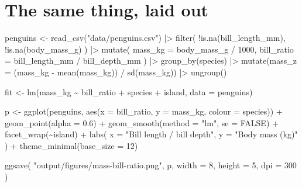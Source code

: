 \documentclass[
  letterpaper,
  justified,
  a4paper]{tufte-book}
\makeatletter
\newenvironment{Shaded}{\begin{snugshade}}{\end{snugshade}}
\newcommand{\AttributeTok}[1]{\textcolor[rgb]{0.40,0.45,0.13}{#1}}
\newcommand{\ConstantTok}[1]{\textcolor[rgb]{0.56,0.35,0.01}{#1}}
\newcommand{\DecValTok}[1]{\textcolor[rgb]{0.68,0.00,0.00}{#1}}
\newcommand{\FloatTok}[1]{\textcolor[rgb]{0.68,0.00,0.00}{#1}}
\newcommand{\FunctionTok}[1]{\textcolor[rgb]{0.28,0.35,0.67}{#1}}
\newcommand{\NormalTok}[1]{\textcolor[rgb]{0.00,0.23,0.31}{#1}}
\newcommand{\OtherTok}[1]{\textcolor[rgb]{0.00,0.23,0.31}{#1}}
\newcommand{\SpecialCharTok}[1]{\textcolor[rgb]{0.37,0.37,0.37}{#1}}
\newcommand{\StringTok}[1]{\textcolor[rgb]{0.13,0.47,0.30}{#1}}
\let\rbporigShaded\Shaded
\let\rbporigendShaded\endShaded
\renewenvironment{Shaded}{%
  \begingroup
  \ifdim\linewidth=\rbpbodywidth
    \advance\linewidth by \@tufte@overhang
    \advance\hsize by \@tufte@overhang
    \advance\columnwidth by \@tufte@overhang
  \fi
  \rbporigShaded
}{%
  \rbporigendShaded
  \endgroup
}
\makeatother
\begin{document}
\section{The same thing, laid out}

\begin{Shaded}
\begin{Highlighting}[]
\NormalTok{penguins }\OtherTok{\textless{}{-}} \FunctionTok{read\_csv}\NormalTok{(}\StringTok{"data/penguins.csv"}\NormalTok{) }\SpecialCharTok{|\textgreater{}}
  \FunctionTok{filter}\NormalTok{(}
    \SpecialCharTok{!}\FunctionTok{is.na}\NormalTok{(bill\_length\_mm),}
    \SpecialCharTok{!}\FunctionTok{is.na}\NormalTok{(body\_mass\_g)}
\NormalTok{  ) }\SpecialCharTok{|\textgreater{}}
  \FunctionTok{mutate}\NormalTok{(}
    \AttributeTok{mass\_kg =}\NormalTok{ body\_mass\_g }\SpecialCharTok{/} \DecValTok{1000}\NormalTok{,}
    \AttributeTok{bill\_ratio =}\NormalTok{ bill\_length\_mm }\SpecialCharTok{/}\NormalTok{ bill\_depth\_mm}
\NormalTok{  ) }\SpecialCharTok{|\textgreater{}}
  \FunctionTok{group\_by}\NormalTok{(species) }\SpecialCharTok{|\textgreater{}}
  \FunctionTok{mutate}\NormalTok{(}\AttributeTok{mass\_z =}\NormalTok{ (mass\_kg }\SpecialCharTok{{-}} \FunctionTok{mean}\NormalTok{(mass\_kg)) }\SpecialCharTok{/} \FunctionTok{sd}\NormalTok{(mass\_kg)) }\SpecialCharTok{|\textgreater{}}
  \FunctionTok{ungroup}\NormalTok{()}

\NormalTok{fit }\OtherTok{\textless{}{-}} \FunctionTok{lm}\NormalTok{(mass\_kg }\SpecialCharTok{\textasciitilde{}}\NormalTok{ bill\_ratio }\SpecialCharTok{+}\NormalTok{ species }\SpecialCharTok{+}\NormalTok{ island, }\AttributeTok{data =}\NormalTok{ penguins)}

\NormalTok{p }\OtherTok{\textless{}{-}} \FunctionTok{ggplot}\NormalTok{(penguins, }\FunctionTok{aes}\NormalTok{(}\AttributeTok{x =}\NormalTok{ bill\_ratio, }\AttributeTok{y =}\NormalTok{ mass\_kg, }\AttributeTok{colour =}\NormalTok{ species)) }\SpecialCharTok{+}
  \FunctionTok{geom\_point}\NormalTok{(}\AttributeTok{alpha =} \FloatTok{0.6}\NormalTok{) }\SpecialCharTok{+}
  \FunctionTok{geom\_smooth}\NormalTok{(}\AttributeTok{method =} \StringTok{"lm"}\NormalTok{, }\AttributeTok{se =} \ConstantTok{FALSE}\NormalTok{) }\SpecialCharTok{+}
  \FunctionTok{facet\_wrap}\NormalTok{(}\SpecialCharTok{\textasciitilde{}}\NormalTok{island) }\SpecialCharTok{+}
  \FunctionTok{labs}\NormalTok{(}
    \AttributeTok{x =} \StringTok{"Bill length / bill depth"}\NormalTok{,}
    \AttributeTok{y =} \StringTok{"Body mass (kg)"}
\NormalTok{  ) }\SpecialCharTok{+}
  \FunctionTok{theme\_minimal}\NormalTok{(}\AttributeTok{base\_size =} \DecValTok{12}\NormalTok{)}

\FunctionTok{ggsave}\NormalTok{(}
  \StringTok{"output/figures/mass{-}bill{-}ratio.png"}\NormalTok{,}
\NormalTok{  p,}
  \AttributeTok{width =} \DecValTok{8}\NormalTok{,}
  \AttributeTok{height =} \DecValTok{5}\NormalTok{,}
  \AttributeTok{dpi =} \DecValTok{300}
\NormalTok{)}
\end{Highlighting}
\end{Shaded}
\end{document}
